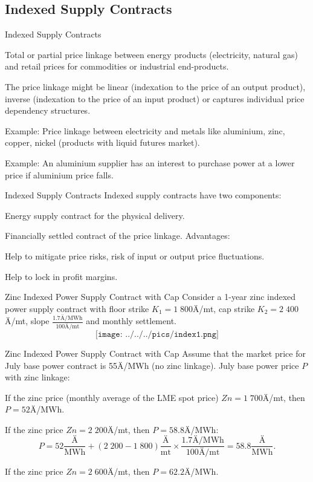 \subsection{Indexed Supply Contracts}

{Indexed Supply Contracts}
  \item<1-> Total or partial price linkage between energy products (electricity, natural gas) and retail prices for commodities or industrial end-products.
  \item<2-> The price linkage might be linear (indexation to the price of an output product), inverse (indexation to the price of an input product) or captures individual price dependency structures.
  \item<3-> Example: Price linkage between electricity and metals like aluminium, zinc, copper, nickel (products with liquid futures market).
  \item<4-> Example: An aluminium supplier has an interest to purchase power at a lower price if aluminium price falls.

{Indexed Supply Contracts}
Indexed supply contracts have two components:
  \item Energy supply contract for the physical delivery.
  \item Financially settled contract of the price linkage.
\vspace{0.5cm}
Advantages:
  \item Help to mitigate price risks, risk of input or output price fluctuations.
  \item Help to lock in profit margins.

{Zinc Indexed Power Supply Contract with Cap}
Consider a 1-year zinc indexed power supply contract with floor strike $K_1=1\;800$Ä/mt, cap strike $K_2=2\;400$Ä/mt, slope $\frac{1.7\text{Ä/MWh}}{100\text{Ä/mt}}$ and monthly settlement.
$$\texttt{[image: ../../../pics/index1.png]}$$

{Zinc Indexed Power Supply Contract with Cap}
Assume that the market price for July base power contract is \textcolor[rgb]{1.00,0.00,0.00}{55Ä/MWh} (no zinc linkage). July base power price $P$ with zinc linkage:\\
\vspace{0.2cm}
  \item<2-> If the zinc price (monthly average of the LME spot price) $Zn=1\;700$Ä/mt, then \textcolor[rgb]{0.00,0.00,1.00}{$P=52$Ä/MWh}.
  \item<3-> If the zinc price $Zn=2\;200$Ä/mt, then \textcolor[rgb]{0.00,0.00,1.00}{$P=58.8$Ä/MWh}:
  $$P=52\frac{\text{Ä}}{\text{MWh}}+(2\;200-1\;800)\frac{\text{Ä}}{\text{mt}}\times\frac{1.7\text{Ä/MWh}}{100\text{Ä/mt}}=58.8\frac{\text{Ä}}{\text{MWh}}.$$
  \item<4-> If the zinc price $Zn=2\;600$Ä/mt, then \textcolor[rgb]{0.00,0.00,1.00}{$P=62.2$Ä/MWh}.

